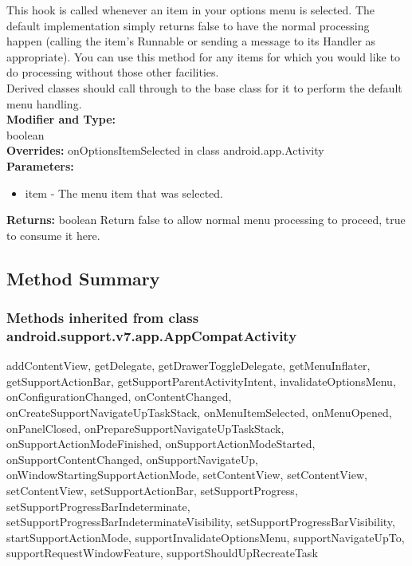 This hook is called whenever an item in your options menu is selected. The default implementation simply returns false to have the normal processing happen (calling the item's Runnable or sending a message to its Handler as appropriate). You can use this method for any items for which you would like to do processing without those other facilities.\\

Derived classes should call through to the base class for it to perform the default menu handling.\\

\textbf{Modifier and Type:}\\
\tab boolean\\


\textbf{Overrides:}
\tab                onOptionsItemSelected in class android.app.Activity\\

\textbf{Parameters:}
\begin{itemize}
\item item - The menu item that was selected.
\end{itemize}


\textbf{Returns:}
\tab        boolean Return false to allow normal menu processing to proceed, true to consume it here.\\








\subsection{Method Summary}

\subsubsection{Methods inherited from class android.support.v7.app.AppCompatActivity}

addContentView, getDelegate, getDrawerToggleDelegate, getMenuInflater, getSupportActionBar, getSupportParentActivityIntent, invalidateOptionsMenu, onConfigurationChanged, onContentChanged, onCreateSupportNavigateUpTaskStack, onMenuItemSelected, onMenuOpened, onPanelClosed, onPrepareSupportNavigateUpTaskStack, onSupportActionModeFinished, onSupportActionModeStarted, onSupportContentChanged, onSupportNavigateUp, onWindowStartingSupportActionMode, setContentView, setContentView, setContentView, setSupportActionBar, setSupportProgress, setSupportProgressBarIndeterminate, setSupportProgressBarIndeterminateVisibility, setSupportProgressBarVisibility, startSupportActionMode, supportInvalidateOptionsMenu, supportNavigateUpTo, supportRequestWindowFeature, supportShouldUpRecreateTask\\


